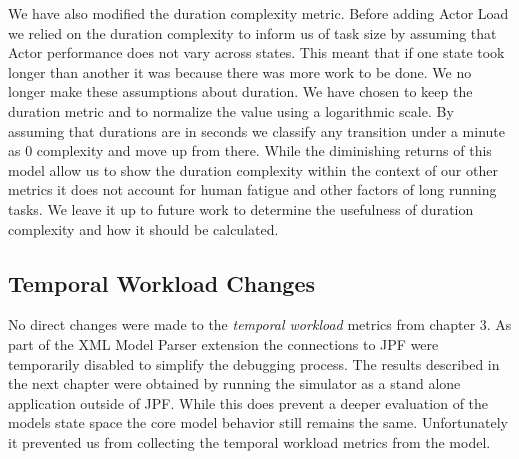 We have also modified the duration complexity metric.  Before adding Actor Load we relied on the duration complexity to inform us of task size by assuming that Actor performance does not vary across states.  This meant that if one state took longer than another it was because there was more work to be done.  We no longer make these assumptions about duration.  We have chosen to keep the duration metric and to normalize the value using a logarithmic scale.  By assuming that durations are in seconds we classify any transition under a minute as 0 complexity and move up from there.  While the diminishing returns of this model allow us to show the duration complexity within the context of our other metrics it does not account for human fatigue and other factors of long running tasks.  We leave it up to future work to determine the usefulness of duration complexity and how it should be calculated.

\subsection{Temporal Workload Changes}
No direct changes were made to the \textit{temporal workload} metrics from chapter 3.  As part of the XML Model Parser extension the connections to JPF were temporarily disabled to simplify the debugging process.  The results described in the next chapter were obtained by running the simulator as a stand alone application outside of JPF.  While this does prevent a deeper evaluation of the models state space the core model behavior still remains the same.  Unfortunately it prevented us from collecting the temporal workload metrics from the model.
